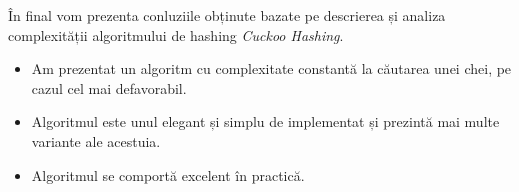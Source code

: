 \documentclass[a4paper]{article}
\theoremstyle{remark}
\theoremstyle{definition}
\begin{document}
În final vom prezenta conluziile obținute bazate pe descrierea și analiza complexității algoritmului de hashing \textit{Cuckoo Hashing}.

\begin{itemize}

\item Am prezentat un algoritm cu complexitate constantă la căutarea unei chei, pe cazul cel mai defavorabil.

\item Algoritmul este unul elegant și simplu de implementat și prezintă mai multe variante ale acestuia.

\item Algoritmul se comportă excelent în practică.

\end{itemize}
\end{document}

